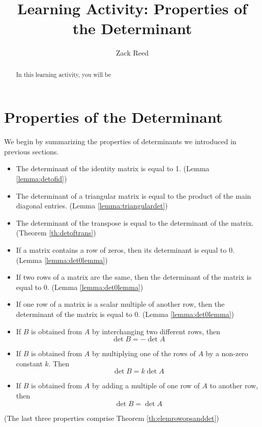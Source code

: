 \documentclass{ximera}
\author{Zack Reed}
\title{Learning Activity: Properties of the Determinant}
\begin{document}
\begin{abstract}

    In this learning activity, you will be 
\end{abstract}
\maketitle


\section*{Properties of the Determinant}
We begin by summarizing the properties of determinants we introduced in previous sections.
 
\begin{summary}
\begin{itemize}
\item The determinant of the identity matrix is equal to 1. (Lemma \ref{lemma:detofid})
\item The determinant of a triangular matrix is equal to the product of the main diagonal entries. (Lemma \ref{lemma:triangulardet})
\item The determinant of the transpose is equal to the determinant of the matrix. (Theorem \ref{th:detoftrans})
\item If a matrix contains a row of zeros, then its determinant is equal to 0. (Lemma \ref{lemma:det0lemma})
\item If two rows of a matrix are the same, then the determinant of the matrix is equal to 0.  (Lemma \ref{lemma:det0lemma})
\item If one row of a matrix is a scalar multiple of another row, then the determinant of the matrix is equal to 0. (Lemma \ref{lemma:det0lemma})
 
\item
If $B$ is obtained from $A$ by interchanging two different rows, then $$\det{B}=-\det{A}$$
\item
If $B$ is obtained from $A$ by multiplying one of the rows of $A$ by a non-zero constant $k$.  Then $$\det{B}=k\det{A}$$
\item
If $B$ is obtained from $A$ by adding a multiple of one row of $A$ to another row, then
$$\det{B}=\det{A}$$
\end{itemize}
(The last three properties comprise Theorem \ref{th:elemrowopsanddet})
\end{summary}
\end{document}
